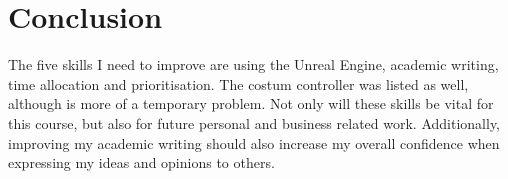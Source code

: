 \documentclass{scrartcl}
\begin{document}
\section{Conclusion}
The five skills I need to improve are using the Unreal Engine, academic writing, time allocation and prioritisation. The costum controller was listed as well, although is more of a temporary problem. Not only will these skills be vital for this course, but also for future personal and business related work. Additionally, improving my academic writing should also increase my overall confidence when expressing my ideas and opinions to others.
\end{document}
